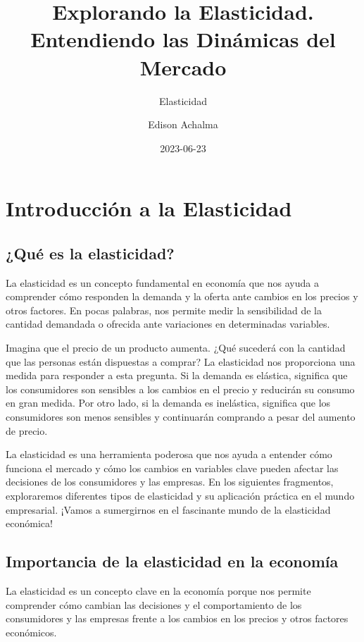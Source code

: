 \documentclass[
  a4paper,
]{article}
\title{Explorando la Elasticidad. Entendiendo las Dinámicas del Mercado}
\subtitle{Elasticidad}
\author{Edison Achalma}
\date{2023-06-23}
\begin{document}
\maketitle

\section{Introducción a la
Elasticidad}\label{introducciuxf3n-a-la-elasticidad}

\subsection{¿Qué es la elasticidad?}\label{quuxe9-es-la-elasticidad}

La elasticidad es un concepto fundamental en economía que nos ayuda a
comprender cómo responden la demanda y la oferta ante cambios en los
precios y otros factores. En pocas palabras, nos permite medir la
sensibilidad de la cantidad demandada o ofrecida ante variaciones en
determinadas variables.

Imagina que el precio de un producto aumenta. ¿Qué sucederá con la
cantidad que las personas están dispuestas a comprar? La elasticidad nos
proporciona una medida para responder a esta pregunta. Si la demanda es
elástica, significa que los consumidores son sensibles a los cambios en
el precio y reducirán su consumo en gran medida. Por otro lado, si la
demanda es inelástica, significa que los consumidores son menos
sensibles y continuarán comprando a pesar del aumento de precio.

La elasticidad es una herramienta poderosa que nos ayuda a entender cómo
funciona el mercado y cómo los cambios en variables clave pueden afectar
las decisiones de los consumidores y las empresas. En los siguientes
fragmentos, exploraremos diferentes tipos de elasticidad y su aplicación
práctica en el mundo empresarial. ¡Vamos a sumergirnos en el fascinante
mundo de la elasticidad económica!

\subsection{Importancia de la elasticidad en la
economía}\label{importancia-de-la-elasticidad-en-la-economuxeda}

La elasticidad es un concepto clave en la economía porque nos permite
comprender cómo cambian las decisiones y el comportamiento de los
consumidores y las empresas frente a los cambios en los precios y otros
factores económicos.
\end{document}
